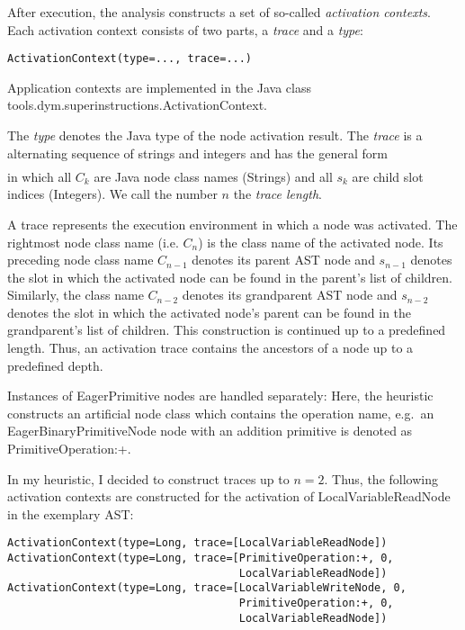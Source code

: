 \documentclass[10pt,a4paper]{article}
\begin{document}
After execution, the analysis constructs a set of so-called \emph{activation contexts}. Each activation context consists of two parts, a \emph{trace} and a \emph{type}:
\begin{verbatim}
ActivationContext(type=..., trace=...)
\end{verbatim}
Application contexts are implemented in the Java class \textsf{tools.dym.superinstructions.{\allowbreak}ActivationContext}.

The \emph{type} denotes the Java type of the node activation result. The \emph{trace} is a alternating sequence of strings and integers and has the general form
\begin{align*}
[ C_0, s_0, C_1, ..., s_{n - 1}, C_{n}]
\end{align*}
in which all $C_k$ are Java node class names (Strings) and all $s_k$ are child slot indices (Integers). We call the number $n$ the \emph{trace length}.

A trace represents the execution environment in which a node was activated. The rightmost node class name (i.e. $C_n$) is the class name of the activated node. Its preceding node class name $C_{n-1}$ denotes its parent AST node and $s_{n-1}$ denotes the slot in which the activated node can be found in the parent's list of children. Similarly, the class name $C_{n-2}$ denotes its grandparent AST node and $s_{n-2}$ denotes the slot in which the activated node's parent can be found in the grandparent's list of children. This construction is continued up to a predefined length. Thus, an activation trace contains the ancestors of a node up to a predefined depth.

Instances of \textsf{EagerPrimitive} nodes are handled separately: Here, the heuristic constructs an artificial node class which contains the operation name, e.g.\ an \textsf{EagerBinaryPrimitiveNode} node with an addition primitive is denoted as \textsf{PrimitiveOperation:+}.

In my heuristic, I decided to construct traces up to $n=2$. Thus, the following activation contexts are constructed for the activation of \textsf{LocalVariableReadNode} in the exemplary AST:

\begin{verbatim}
ActivationContext(type=Long, trace=[LocalVariableReadNode])
ActivationContext(type=Long, trace=[PrimitiveOperation:+, 0,
                                    LocalVariableReadNode])
ActivationContext(type=Long, trace=[LocalVariableWriteNode, 0,
                                    PrimitiveOperation:+, 0,
                                    LocalVariableReadNode])
\end{verbatim}
\end{document}
